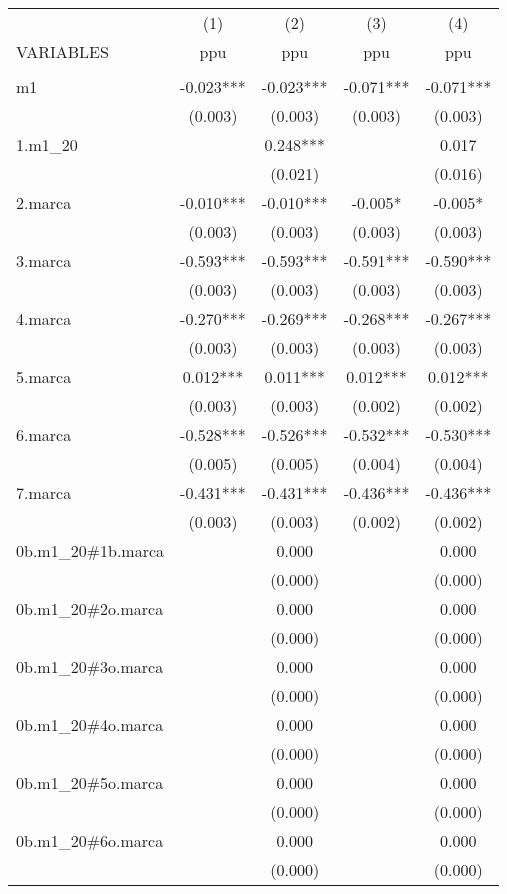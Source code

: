 \begin{tabular}{lcccc} \hline
 & (1) & (2) & (3) & (4) \\
VARIABLES & ppu & ppu & ppu & ppu \\ \hline
 &  &  &  &  \\
m1 & -0.023*** & -0.023*** & -0.071*** & -0.071*** \\
 & (0.003) & (0.003) & (0.003) & (0.003) \\
1.m1\_20 &  & 0.248*** &  & 0.017 \\
 &  & (0.021) &  & (0.016) \\
2.marca & -0.010*** & -0.010*** & -0.005* & -0.005* \\
 & (0.003) & (0.003) & (0.003) & (0.003) \\
3.marca & -0.593*** & -0.593*** & -0.591*** & -0.590*** \\
 & (0.003) & (0.003) & (0.003) & (0.003) \\
4.marca & -0.270*** & -0.269*** & -0.268*** & -0.267*** \\
 & (0.003) & (0.003) & (0.003) & (0.003) \\
5.marca & 0.012*** & 0.011*** & 0.012*** & 0.012*** \\
 & (0.003) & (0.003) & (0.002) & (0.002) \\
6.marca & -0.528*** & -0.526*** & -0.532*** & -0.530*** \\
 & (0.005) & (0.005) & (0.004) & (0.004) \\
7.marca & -0.431*** & -0.431*** & -0.436*** & -0.436*** \\
 & (0.003) & (0.003) & (0.002) & (0.002) \\
0b.m1\_20\#1b.marca &  & 0.000 &  & 0.000 \\
 &  & (0.000) &  & (0.000) \\
0b.m1\_20\#2o.marca &  & 0.000 &  & 0.000 \\
 &  & (0.000) &  & (0.000) \\
0b.m1\_20\#3o.marca &  & 0.000 &  & 0.000 \\
 &  & (0.000) &  & (0.000) \\
0b.m1\_20\#4o.marca &  & 0.000 &  & 0.000 \\
 &  & (0.000) &  & (0.000) \\
0b.m1\_20\#5o.marca &  & 0.000 &  & 0.000 \\
 &  & (0.000) &  & (0.000) \\
0b.m1\_20\#6o.marca &  & 0.000 &  & 0.000 \\
 &  & (0.000) &  & (0.000) \\

\end{tabular}
